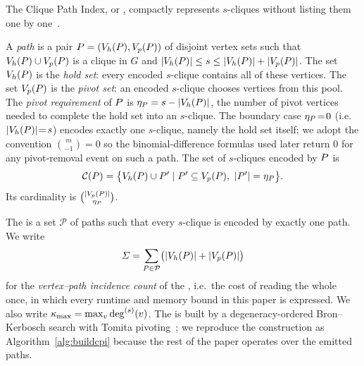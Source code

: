 \label{sec:prelim-cpi}
The Clique Path Index, or \cpi{}, compactly represents $s$-cliques without listing them one by one~\cite{NuclearCD}.

\begin{definition}\label{def:path}
A \emph{\cpi{} path} is a pair $\TPath=(\Vh(\TPath),\Vp(\TPath))$ of disjoint vertex sets such that $\Vh(\TPath)\cup\Vp(\TPath)$ is a clique in $G$ and $|\Vh(\TPath)|\le s\le|\Vh(\TPath)|+|\Vp(\TPath)|$.
%
The set $\Vh(\TPath)$ is the \emph{hold set}: every encoded $s$-clique contains all of these vertices.
%
The set $\Vp(\TPath)$ is the \emph{pivot set}: an encoded $s$-clique chooses vertices from this pool.
%
The \emph{pivot requirement} of $\TPath$ is $\eta_{\TPath}=s-|\Vh(\TPath)|$, the number of pivot vertices needed to complete the hold set into an $s$-clique.
%
The boundary case $\eta_{\TPath}\!=\!0$ (i.e.\ $|\Vh(\TPath)|\!=\!s$) encodes exactly one $s$-clique, namely the hold set itself; we adopt the convention $\binom{m}{-1}=0$ so the binomial-difference formulas used later return $0$ for any pivot-removal event on such a path.
%
The set of $s$-cliques encoded by $\TPath$ is
\[
  \mathcal{C}(\TPath)
  =
  \bigl\{\Vh(\TPath)\cup P'\mid P'\subseteq\Vp(\TPath),\ |P'|=\eta_{\TPath}\bigr\}.
\]
Its cardinality is $\binom{|\Vp(\TPath)|}{\eta_{\TPath}}$.
\end{definition}

The \cpi{} is a set $\mathcal{P}$ of paths such that every $s$-clique is encoded by exactly one path.
%
We write
\[
  \Sig=\sum_{\TPath\in\mathcal{P}}\bigl(|\Vh(\TPath)|+|\Vp(\TPath)|\bigr)
\]
for the \emph{vertex--path incidence count} of the \cpi{}, i.e.\ the cost of reading the whole \cpi{} once, in which every runtime and memory bound in this paper is expressed.
%
We also write $\kappa_{\max}=\max_v\deg^{(s)}(v)$.
%
The \cpi{} is built by a degeneracy-ordered Bron--Kerbosch search with Tomita pivoting~\cite{NuclearCD,BronKerbosch,eppstein,tomita}; we reproduce the construction as Algorithm~\ref{alg:buildcpi} because the rest of the paper operates over the emitted paths.

